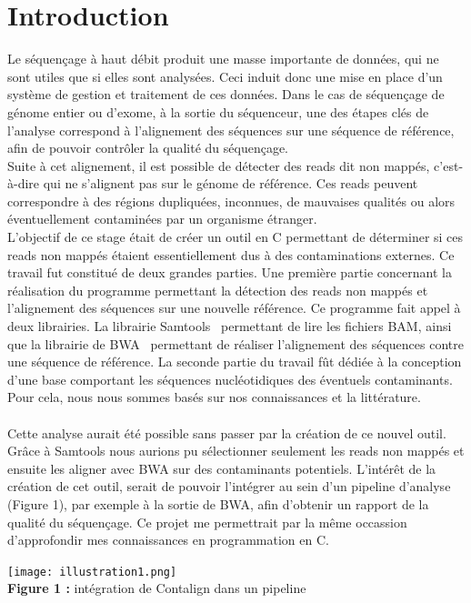 \documentclass[a4paper,12pt]{article}
\begin{document}
\section{Introduction}

Le séquençage à haut débit produit une masse importante de données, qui ne sont utiles que si elles sont analysées. Ceci induit donc une mise en place d'un système de gestion et traitement de ces données. Dans le cas de séquençage de génome entier ou d'exome, à la sortie du séquenceur, une des étapes clés de l'analyse correspond à l'alignement des séquences sur une séquence de référence, afin de pouvoir contrôler la qualité du séquençage. \\
Suite à cet alignement, il est possible de détecter des reads dit non mappés, c'est-à-dire qui ne s'alignent pas sur le génome de référence. Ces reads peuvent correspondre à des régions dupliquées, inconnues, de mauvaises qualités ou alors éventuellement contaminées par un organisme étranger. \\

L'objectif de ce stage était de créer un outil en C permettant de déterminer si ces reads non mappés étaient essentiellement dus à des contaminations externes. Ce travail fut constitué de deux grandes parties. Une première partie concernant la réalisation du programme permettant la détection des reads non mappés et l'alignement des séquences sur une nouvelle référence. Ce programme fait appel à deux librairies. La librairie Samtools~\cite{SAM} permettant de lire les fichiers BAM, ainsi que la librairie de BWA~\cite{BWA} permettant de réaliser l'alignement des séquences contre une séquence de référence. La seconde partie du travail fût dédiée à la conception d'une base comportant les séquences nucléotidiques des éventuels contaminants. Pour cela, nous nous sommes basés sur nos connaissances et la littérature. \\\\
Cette analyse aurait été possible sans passer par la création de ce nouvel outil. Grâce à Samtools nous aurions pu sélectionner seulement les reads non mappés et ensuite les aligner avec BWA sur des contaminants potentiels. L'intérêt de la création de cet outil, serait de pouvoir l'intégrer au sein d'un pipeline d'analyse (Figure 1), par exemple à la sortie de BWA, afin d'obtenir un rapport de la qualité du séquençage. Ce projet me permettrait par la même occassion d'approfondir mes connaissances en programmation en C. 
\begin{center}
\texttt{[image: illustration1.png]}~\\
\textbf{Figure 1 :} intégration de Contalign dans un pipeline
\end{center}
\end{document}
